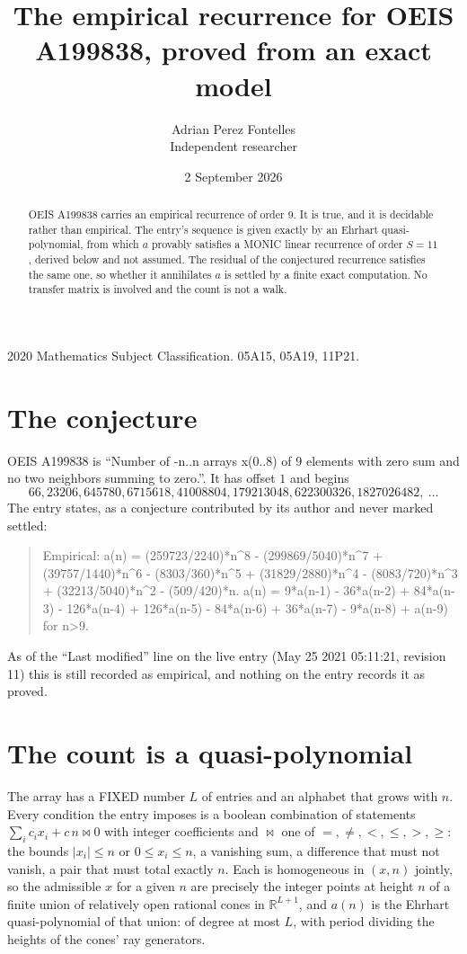 \documentclass[11pt,a4paper]{article}
\title{The empirical recurrence for OEIS A199838, proved from an exact model}
\author{Adrian Perez Fontelles\\ \small Independent researcher}
\date{2 September 2026}
\theoremstyle{plain}
\theoremstyle{definition}
\begin{document}
\maketitle

\begin{abstract}
OEIS A199838 carries an empirical recurrence of order $9$. It is true, and it is
decidable rather than empirical. The entry's sequence is given exactly by an Ehrhart quasi-polynomial, from
which $a$ provably satisfies a MONIC linear recurrence of order $S=11$, derived below and not
assumed. The residual of the conjectured recurrence satisfies the same one, so whether it
annihilates $a$ is settled by a finite exact computation. No transfer matrix is involved and
the count is not a walk.
\end{abstract}

\noindent\small 2020 Mathematics Subject Classification. 05A15, 05A19, 11P21.\normalsize

\section{The conjecture}

OEIS A199838 is ``Number of -n..n arrays x(0..8) of 9 elements with zero sum and no two neighbors summing to zero.''. It has offset $1$ and begins
\[
66, 23206, 645780, 6715618, 41008804, 179213048, 622300326, 1827026482,\ \dots
\]
The entry states, as a conjecture contributed by its author and never marked settled:
\begin{quote}
Empirical: a(n) = (259723/2240)*n\^{}8 - (299869/5040)*n\^{}7 + (39757/1440)*n\^{}6 - (8303/360)*n\^{}5 + (31829/2880)*n\^{}4 - (8083/720)*n\^{}3 + (32213/5040)*n\^{}2 - (509/420)*n. a(n) = 9*a(n-1) - 36*a(n-2) + 84*a(n-3) - 126*a(n-4) + 126*a(n-5) - 84*a(n-6) + 36*a(n-7) - 9*a(n-8) + a(n-9) for n>9.
\end{quote}
As of the ``Last modified'' line on the live entry (May 25 2021 05:11:21, revision 11)
this is still recorded as empirical, and nothing on the entry records it as proved.

\section{The count is a quasi-polynomial}

The array has a FIXED number $L$ of entries and an alphabet that grows with $n$. Every
condition the entry imposes is a boolean combination of statements
$\sum_i c_ix_i + c\,n \bowtie 0$ with integer coefficients and $\bowtie$ one of
$=,\ne,<,\le,>,\ge$: the bounds $|x_i|\le n$ or $0\le x_i\le n$, a vanishing sum, a difference
that must not vanish, a pair that must total exactly $n$. Each is homogeneous in $(x,n)$
jointly, so the admissible $x$ for a given $n$ are precisely the integer points at height $n$
of a finite union of relatively open rational cones in $\mathbb{R}^{L+1}$, and $a(n)$ is
the Ehrhart quasi-polynomial of that union: of degree at most $L$, with period dividing the
heights of the cones' ray generators.
\end{document}
